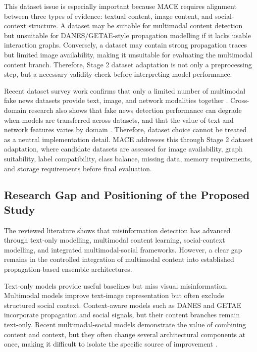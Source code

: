 This dataset issue is especially important because MACE requires alignment between three types of evidence: textual content, image content, and social-context structure. A dataset may be suitable for multimodal content detection but unsuitable for DANES/GETAE-style propagation modelling if it lacks usable interaction graphs. Conversely, a dataset may contain strong propagation traces but limited image availability, making it unsuitable for evaluating the multimodal content branch. Therefore, Stage 2 dataset adaptation is not only a preprocessing step, but a necessary validity check before interpreting model performance.

Recent dataset survey work confirms that only a limited number of multimodal fake news datasets provide text, image, and network modalities together \citep{lv2025multimodal}. Cross-domain research also shows that fake news detection performance can degrade when models are transferred across datasets, and that the value of text and network features varies by domain \citep{silva2021embracing}. Therefore, dataset choice cannot be treated as a neutral implementation detail. MACE addresses this through Stage 2 dataset adaptation, where candidate datasets are assessed for image availability, graph suitability, label compatibility, class balance, missing data, memory requirements, and storage requirements before final evaluation.

\subsection{Research Gap and Positioning of the Proposed Study}

The reviewed literature shows that misinformation detection has advanced through text-only modelling, multimodal content learning, social-context modelling, and integrated multimodal-social frameworks. However, a clear gap remains in the controlled integration of multimodal content into established propagation-based ensemble architectures.

Text-only models provide useful baselines but miss visual misinformation. Multimodal models improve text-image representation but often exclude structured social context. Context-aware models such as DANES and GETAE incorporate propagation and social signals, but their content branches remain text-only. Recent multimodal-social models demonstrate the value of combining content and context, but they often change several architectural components at once, making it difficult to isolate the specific source of improvement \citep{Nadeem2023,jing2025,Dellys2025,Chen2025,Sun25,Ji2026LDPG}.

